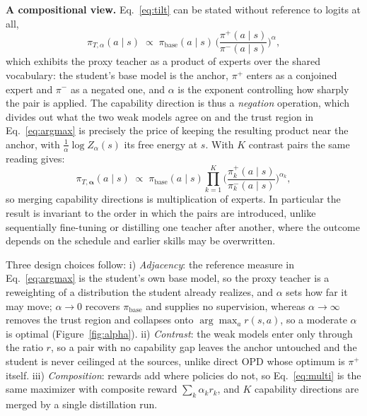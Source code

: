 \documentclass{article}
\begin{document}
\noindent\textbf{A compositional view.}
Eq.~\ref{eq:tilt} can be stated without reference to logits at all,
\begin{equation}
  \pi_{T,\alpha}(a \mid s)\;\propto\;\pi_{\mathrm{base}}(a \mid s)\,
  \Big(\frac{\pi^{+}(a\mid s)}{\pi^{-}(a\mid s)}\Big)^{\alpha},
  \label{eq:poe}
\end{equation}
which exhibits the proxy teacher as a product of experts over the shared vocabulary:
the student's base model is the anchor, $\pi^{+}$ enters as a conjoined expert and
$\pi^{-}$ as a negated one, and $\alpha$ is the exponent controlling how sharply the
pair is applied. The capability direction is thus a \emph{negation} operation, which divides out what the two weak models agree on and the trust region in Eq.~\ref{eq:argmax} is precisely the price of keeping the resulting product near the
anchor, with $\tfrac{1}{\alpha}\log Z_{\alpha}(s)$ its free energy at $s$. With $K$
contrast pairs the same reading gives:
\begin{equation}
  \pi_{T,\boldsymbol{\alpha}}(a \mid s)\;\propto\;\pi_{\mathrm{base}}(a\mid s)
  \prod_{k=1}^{K}\Big(\frac{\pi^{+}_{k}(a \mid s)}{\pi^{-}_{k}(a\mid s)}\Big)^{\alpha_{k}},
  \label{eq:multipoe}
\end{equation}
so merging capability directions is multiplication of experts. In particular the
result is invariant to the order in which the pairs are introduced, unlike
sequentially fine-tuning or distilling one teacher after another, where the outcome
depends on the schedule and earlier skills may be overwritten.

Three design choices follow: i) \emph{Adjacency}: the reference measure in
Eq.~\ref{eq:argmax} is the student's own base model, so the proxy teacher is a
reweighting of a distribution the student already realizes, and $\alpha$ sets how far
it may move; $\alpha\!\to\!0$ recovers $\pi_{\mathrm{base}}$ and supplies no
supervision, whereas $\alpha\!\to\!\infty$ removes the trust region and collapses onto
$\arg\max_{a} r(s,a)$, so a moderate $\alpha$ is optimal (Figure~\ref{fig:alpha}).
ii) \emph{Contrast}: the weak models enter only through the ratio $r$, so a pair with no
capability gap leaves the anchor untouched and the student is never ceilinged at the
sources, unlike direct OPD whose optimum is $\pi^{+}$ itself. iii) \emph{Composition}:
rewards add where policies do not, so Eq.~\ref{eq:multi} is the same maximizer with
composite reward $\sum_{k}\alpha_{k}r_{k}$, and $K$ capability directions are merged
by a single distillation run.
\end{document}
